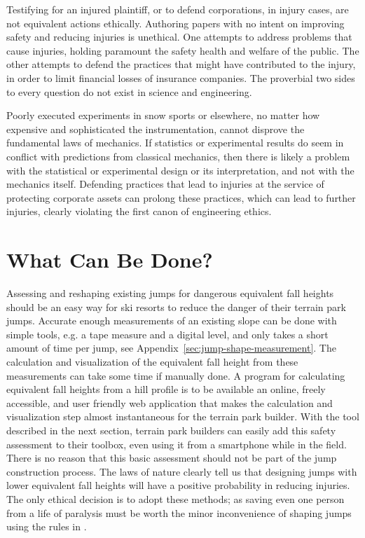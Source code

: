\documentclass{article}
\begin{document}
Testifying for an injured plaintiff, or to defend corporations, in injury
cases, are not equivalent actions ethically. Authoring papers with
no intent on improving safety and reducing injuries is unethical. One attempts to
address problems that cause injuries, holding paramount the safety health
and welfare of the public. The other attempts to defend the practices that
might have contributed to the injury, in order to limit financial losses of insurance
companies. The proverbial two sides to every question do not exist in science and
engineering.

Poorly executed experiments in snow sports or elsewhere, no matter how expensive and
sophisticated the instrumentation, cannot disprove the fundamental
laws of  mechanics. If statistics or experimental results do seem in
conflict with predictions from classical mechanics, then there is likely a problem
with the statistical or experimental design or its interpretation, and not
with the mechanics itself. Defending practices that lead to injuries at the
service of protecting corporate assets can prolong these practices, which can lead to further
injuries, clearly violating the first canon of engineering ethics.



\section{What Can Be Done?}
%
Assessing and reshaping existing jumps for dangerous equivalent fall heights should be an easy way for ski resorts to reduce the danger of their
terrain park jumps. Accurate enough measurements of an existing slope can be
done with simple tools, e.g. a tape measure and a digital level, and only takes
a short amount of time per jump, see Appendix~\ref{sec:jump-shape-measurement}.
The calculation and visualization of the equivalent fall height from these
measurements can take some time if manually done. A program for calculating equivalent  fall heights from a hill profile is to be
available an online, freely accessible, and user friendly web application that
makes the calculation and visualization step almost instantaneous for the
terrain park builder. With the tool described in the next section, terrain park
builders can easily add this safety assessment to their toolbox, even using it
from a smartphone while in the field. There is no reason that this basic
assessment should not be part of the jump construction process. The laws of
nature clearly tell us that designing jumps with lower equivalent fall heights
will have a positive probability in reducing injuries.  The only ethical
decision is to adopt these methods; as saving even one person from a life of
paralysis must be worth the minor inconvenience of shaping jumps using the
rules in \cite{Levy2015}.
\end{document}
